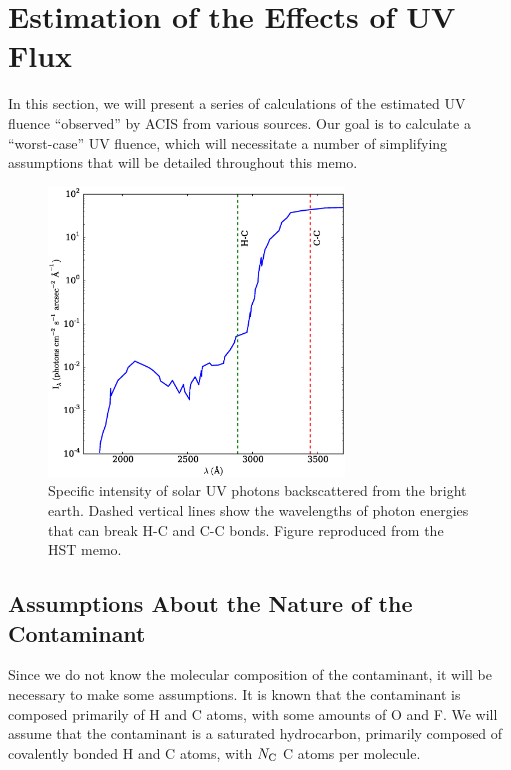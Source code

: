 \documentclass[11pt]{article}
\begin{document}
\section{Estimation of the Effects of UV Flux}

In this section, we will present a series of calculations of the estimated UV fluence
``observed'' by ACIS from various sources. Our goal is to calculate a ``worst-case'' UV
fluence, which will necessitate a number of simplifying assumptions that will be detailed
throughout this memo.

\begin{figure}
\begin{center}
\includegraphics[width=0.7\textwidth]{bright_earth_intensity.eps}
\caption{Specific intensity of solar UV photons backscattered from the bright earth. Dashed
vertical lines show the wavelengths of photon energies that can break H-C and C-C bonds.
Figure reproduced from the HST memo.\label{fig:bright_earth_intensity}}
\end{center}
\end{figure}

\subsection{Assumptions About the Nature of the Contaminant}

Since we do not know the molecular composition of the contaminant, it will be necessary to make
some assumptions. It is known that the contaminant is composed primarily of H and C atoms,
with some amounts of O and F. We will assume that the contaminant is a saturated hydrocarbon,
primarily composed of covalently bonded H and C atoms, with $N_{\rm C}$ C atoms per molecule.
\end{document}
